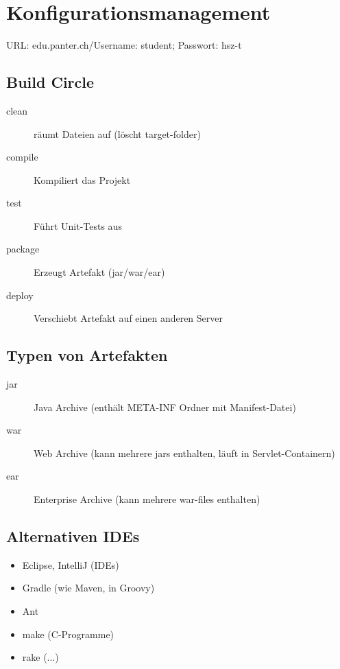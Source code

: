 \section{Konfigurationsmanagement}
URL: edu.panter.ch/Username: student; Passwort: hsz-t
\subsection{Build Circle}
\begin{description}
 \item [clean] räumt Dateien auf (löscht target-folder)
 \item [compile] Kompiliert das Projekt
 \item [test] Führt Unit-Tests aus
 \item [package] Erzeugt Artefakt (jar/war/ear)
 \item [deploy] Verschiebt Artefakt auf einen anderen Server
\end{description}

\subsection{Typen von Artefakten}
\begin{description}
 \item [jar] Java Archive (enthält META-INF Ordner mit Manifest-Datei)
 \item [war] Web Archive (kann mehrere jars enthalten, läuft in Servlet-Containern)
 \item [ear] Enterprise Archive (kann mehrere war-files enthalten)
\end{description}

\subsection{Alternativen IDEs}
\begin{itemize}
 \item Eclipse, IntelliJ (IDEs)
 \item Gradle (wie Maven, in Groovy)
 \item Ant
 \item make (C-Programme)
 \item rake (...)
\end{itemize}

